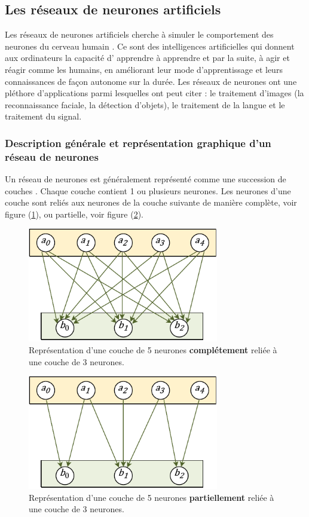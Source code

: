 \subsection{Les réseaux de neurones artificiels}

Les réseaux de neurones artificiels cherche à simuler le comportement des neurones du cerveau humain \cite{mcculloch43a}. Ce sont des intelligences artificielles qui donnent aux ordinateurs la capacité d' \og apprendre à apprendre \fg{} et par la suite, à agir et réagir comme les humains, en améliorant leur mode d'apprentissage et leurs connaissances de façon autonome sur la durée. Les réseaux de neurones ont une pléthore d'applications parmi lesquelles ont peut citer : le traitement d'images (la reconnaissance faciale, la détection d'objets), le traitement de la langue et le traitement du signal.
\subsubsection{Description générale et représentation graphique d'un réseau de neurones}
Un réseau de neurones est généralement représenté comme une succession de \og couches \fg{}. Chaque couche contient 1 ou plusieurs neurones. Les neurones d'une couche sont reliés aux neurones de la couche suivante de manière complète, voir figure (\ref{RN_all_connect}), ou partielle, voir figure (\ref{RN_partial_connect}).

\begin{figure}[H]
	\centerline{
		\includegraphics[height=5cm]{images_these/RN_all_connect.pdf}}
	\caption[Une couche de 5 neurones complétement reliée à une couche de 3 neurones. ]{Représentation d'une couche de 5 neurones \textbf{complétement} reliée à une couche de 3 neurones.}
	\label{RN_all_connect}
\end{figure}

\begin{figure}[H]
	\centerline{
		\includegraphics[height=5cm]{images_these/RN_partial_connect.pdf}}
	\caption[Une couche de 5 neurones partiellement reliée à une couche de 3 neurones. ]{Représentation d'une couche de 5 neurones \textbf{partiellement} reliée à une couche de 3 neurones.}
	\label{RN_partial_connect}
\end{figure}

